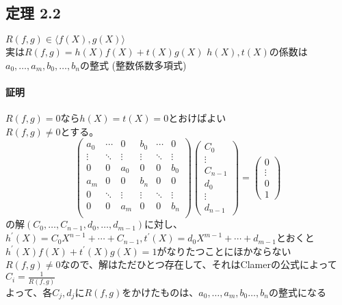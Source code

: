 \documentclass[12pt,a4paper]{article}
\begin{document}
\subsection*{定理 2.2}
  $R (f,g) \in \langle f(X), g(X) \rangle$ \\
  実は$R (f, g) = h(X) f(X) + t(X) g(X)$
  $h(X), t(X)$の係数は$a_0, \ldots , a_m, b_0 , \ldots , b_n$の整式 (整数係数多項式)
  \paragraph{証明}
    $R(f, g) = 0$なら$h(X) = t(X) = 0$とおけばよい\\
    $R(f, g) \neq 0$とする。 \\
  \[ \begin{pmatrix}
      a_0 & \cdots & 0 & b_0 & \cdots & 0 \\
      \vdots & \ddots & \vdots &  \vdots & \ddots & \vdots \\
      0 & 0 & a_0 & 0 & 0 & b_0 \\
      a_m & 0 & 0 & b_n & 0 & 0 \\
      0 & \ddots & \vdots & \vdots & \ddots & \vdots \\
      0 & 0 & a_m & 0 & 0 & b_n \\
  \end{pmatrix}  
  \begin{pmatrix}
    C_0 \\ \vdots \\ C_{n-1} \\ d_0 \\ \vdots \\ d_{n-1}
  \end{pmatrix} = 
  \begin{pmatrix}
    0 \\ \vdots \\ 0 \\ 1
  \end{pmatrix}\]
  の解$(C_0, \ldots , C_{n-1}, d_0, \ldots , d_{m-1})$に対し、\\
  $h^\prime (X) = C_0 X^{n-1} + \cdots + C_{n-1}, t^\prime (X) = d_0 X^{m-1} + \cdots + d_{m-1}$とおくと \\
  $h^\prime (X) f(X) + t^\prime(X) g(X) = 1$がなりたつことにほかならない \\
  $R(f, g) \neq 0$なので、解はただひとつ存在して、それはClamerの公式によって \\
  $C_i = \frac1{R(f,g)}$\\
  よって、各$C_j, d_j$に$R(f,g)$をかけたものは、$a_0, \ldots , a_m , b_0 \ldots , b_n$の整式になる \\
\end{document}

